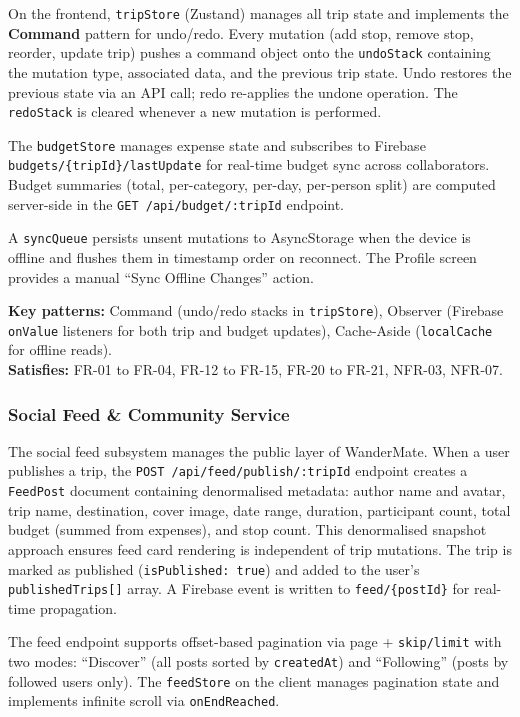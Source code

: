 \documentclass[12pt, a4paper]{article}
\begin{document}
On the frontend, \texttt{tripStore} (Zustand) manages all trip state and implements the \textbf{Command} pattern for undo/redo. Every mutation (add stop, remove stop, reorder, update trip) pushes a command object onto the \texttt{undoStack} containing the mutation type, associated data, and the previous trip state. Undo restores the previous state via an API call; redo re-applies the undone operation. The \texttt{redoStack} is cleared whenever a new mutation is performed.

The \texttt{budgetStore} manages expense state and subscribes to Firebase \texttt{budgets/\{tripId\}/lastUpdate} for real-time budget sync across collaborators. Budget summaries (total, per-category, per-day, per-person split) are computed server-side in the \texttt{GET /api/budget/:tripId} endpoint.

A \texttt{syncQueue} persists unsent mutations to AsyncStorage when the device is offline and flushes them in timestamp order on reconnect. The Profile screen provides a manual ``Sync Offline Changes'' action.

\begin{tcolorbox}[notebox]
  \textbf{Key patterns:} Command (undo/redo stacks in \texttt{tripStore}), Observer (Firebase \texttt{onValue} listeners for both trip and budget updates), Cache-Aside (\texttt{localCache} for offline reads).\\[2pt]
  \textbf{Satisfies:} FR-01 to FR-04, FR-12 to FR-15, FR-20 to FR-21, NFR-03, NFR-07.
\end{tcolorbox}

\subsubsection{Social Feed \& Community Service}

The social feed subsystem manages the public layer of WanderMate. When a user publishes a trip, the \texttt{POST /api/feed/publish/:tripId} endpoint creates a \texttt{FeedPost} document containing denormalised metadata: author name and avatar, trip name, destination, cover image, date range, duration, participant count, total budget (summed from expenses), and stop count. This denormalised snapshot approach ensures feed card rendering is independent of trip mutations. The trip is marked as published (\texttt{isPublished: true}) and added to the user's \texttt{publishedTrips[]} array. A Firebase event is written to \texttt{feed/\{postId\}} for real-time propagation.

The feed endpoint supports offset-based pagination via page + \texttt{skip/limit} with two modes: ``Discover'' (all posts sorted by \texttt{createdAt}) and ``Following'' (posts by followed users only). The \texttt{feedStore} on the client manages pagination state and implements infinite scroll via \texttt{onEndReached}.
\end{document}
